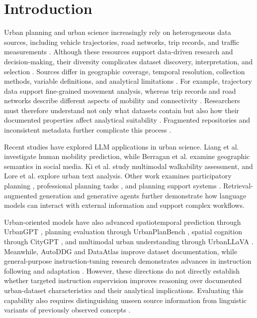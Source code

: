 \documentclass[a4paper,fleqn]{cas-sc}
\begin{document}


\section{Introduction}\label{sec1}

Urban planning and urban science increasingly rely on heterogeneous data sources, including vehicle trajectories, road networks, trip records, and traffic measurements \cite{zheng2014urban, pan2016urban, sarker2022smart, hashem2023urban}. Although these resources support data-driven research and decision-making, their diversity complicates dataset discovery, interpretation, and selection \cite{engin2020data, tekouabou2022identifying}. Sources differ in geographic coverage, temporal resolution, collection methods, variable definitions, and analytical limitations \cite{tekouabou2022identifying, wang2023libcity}. For example, trajectory data support fine-grained movement analysis, whereas trip records and road networks describe different aspects of mobility and connectivity \cite{wang2023libcity}. Researchers must therefore understand not only what datasets contain but also how their documented properties affect analytical suitability \cite{paton2023dataset}. Fragmented repositories and inconsistent metadata further complicate this process \cite{petit2025datagraphy, zhang2026autoddg}.


Recent studies have explored LLM applications in urban science. Liang et al. \cite{liang2024mobility} investigate human mobility prediction, while Berragan et al. \cite{berragan2024semantic} examine geographic semantics in social media. Ki et al. \cite{ki2025walkability} study multimodal walkability assessment, and Lore et al. \cite{lore2024hybrid} explore urban text analysis. Other work examines participatory planning \cite{zhou2024llm}, professional planning tasks \cite{zhao2025urban}, and planning support systems \cite{zhu2024plangpt}. Retrieval-augmented generation \cite{lewis2020retrieval} and generative agents \cite{park2023generative} further demonstrate how language models can interact with external information and support complex workflows.

Urban-oriented models have also advanced spatiotemporal prediction through UrbanGPT \cite{li2024urbangpt}, planning evaluation through UrbanPlanBench \cite{zheng2025urbanplanbench}, spatial cognition through CityGPT \cite{feng2025citygpt}, and multimodal urban understanding through UrbanLLaVA \cite{feng2025urbanllava}. Meanwhile, AutoDDG \cite{zhang2026autoddg} and DataAtlas \cite{giancotti2026dataatlas} improve dataset documentation, while general-purpose instruction-tuning research demonstrates advances in instruction following and adaptation \cite{chung2024scaling, zhou2023lima, longpre2023flan}. However, these directions do not directly establish whether targeted instruction supervision improves reasoning over documented urban-dataset characteristics and their analytical implications. Evaluating this capability also requires distinguishing unseen source information from linguistic variants of previously observed concepts \cite{kaufman2012leakage}.
\end{document}

